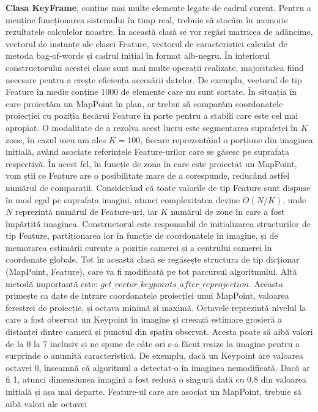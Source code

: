 \documentclass[12pt,a4paper]{report}
\begin{document}
\textbf{Clasa KeyFrame}, conține mai multe elemente legate de cadrul curent. Pentru a menține 
funcționarea sistemului în timp real, trebuie să stocăm în memorie rezultatele calculelor noastre.
În această clasă se vor regăsi matricea de adâncime, vectorul de instanțe ale clasei Feature,
vectorul de caracteristici calculat de metoda bag-of-words și cadrul inițial în format alb-negru. 
În interiorul constructorului acestei clase sunt mai multe operații realizate, majoritatea fiind necesare
pentru a crește eficiența accesării datelor. De exemplu, vectorul de tip Feature
în medie conține 1000 de elemente care nu sunt sortate. În situația în care proiectăm un MapPoint în 
plan, ar trebui să comparăm coordonatele proiecției cu poziția fiecărui Feature în parte pentru a 
stabili care este cel mai apropiat. O modalitate de a rezolva acest lucru este segmentarea suprafeței
în \(K\) zone, în cazul meu am ales $ K = 100$, fiecare reprezentând o porțiune din imaginea inițială,
având asociate referințele Feature-urilor care se găsesc pe suprafața respectivă. În acest fel,
în funcție de zona în care este proiectat un MapPoint, vom știi ce Feature are o posibilitate
mare de a corespunde, reducând astfel numărul de comparații.
Considerând că toate valorile de tip Feature sunt dispuse în mod egal pe suprafața imagini, atunci
complexitatea devine $ O(N / K) $, unde \(N\) reprezintă numărul de Feature-uri, iar \(K\) 
numărul de zone în care a fost împărțită imaginea. Constructorul este responsabil de inițializarea
structurilor de tip Feature, partiționarea lor în funcție de coordonatele în imagine, și de memorarea
estimării curente a poziție camerei și a centrului camerei în coordonate globale. Tot în această 
clasă se regăsește structura de tip dicționar (MapPoint, Feature), care va fi modificată pe tot 
parcursul algoritmului. Altă metodă importantă este: $ get\_vector\_keypoints\_after\_reprojection $.
Aceasta primește ca date de intrare coordonatele proiecției unui MapPoint, valoarea ferestrei 
de proiecție, și octava minimă și maximă. Octavele reprezintă nivelul la care a fost observat 
un Keypoint în imagine și creează estimare grosieră a distanței dintre cameră și punctul din spațiu 
observat. Acesta poate să aibă valori de la 0 la 7 inclusiv și ne spune de câte ori 
s-a făcut resize la imagine pentru a surprinde o anumită caracteristică. De exemplu, dacă 
un Keypoint are valoarea octavei 0, înseamnă că algoritmul a detectat-o în imaginea nemodificată.
Dacă ar fi 1, atunci dimensiunea imagini a fost redusă o singură dată cu 0.8 din valoarea inițială 
și așa mai departe. Feature-ul care are asociat un MapPoint, trebuie să aibă valori ale octavei
\end{document}
